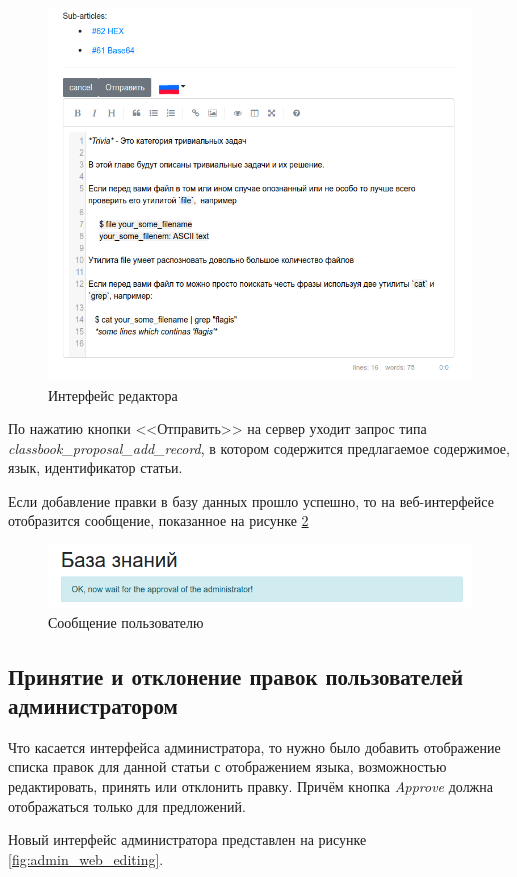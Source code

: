 \begin{figure}[!h]
    \centering
    \includegraphics[width=0.6\linewidth]{images/user_web_editing.png}
    \caption{Интерфейс редактора}
    \label{fig:web_user_editor}
\end{figure}


По нажатию кнопки <<Отправить>> на сервер уходит запрос типа \\
\emph{classbook\_proposal\_add\_record}, в котором содержится
предлагаемое содержимое, язык, идентификатор статьи.

Если добавление правки в базу данных прошло успешно, 
то на веб-интерфейсе отобразится сообщение, показанное на рисунке \ref{fig:user_wait_msg}

\begin{figure}[!h]
    \centering
    \includegraphics[width=0.6\linewidth]{images/user_wait_msg.png}
    \caption{Сообщение пользователю}
    \label{fig:user_wait_msg}
\end{figure}

\vspace{2em}

\subsection{Принятие и отклонение правок пользователей администратором}

Что касается интерфейса администратора, то нужно было добавить отображение списка правок
для данной статьи с отображением языка, возможностью редактировать, принять или отклонить правку.
Причём кнопка \emph{Approve} должна отображаться только для предложений.

Новый интерфейс администратора представлен на рисунке \ref{fig:admin_web_editing}.


